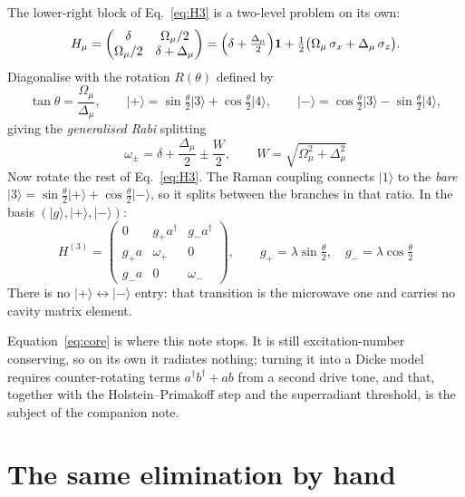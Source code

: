 \documentclass[11pt,a4paper]{article}
\newcommand{\ket}[1]{\lvert #1 \rangle}
\newcommand{\dg}{^{\dagger}}
\newcommand{\Omu}{\Omega_{\mu}}
\newcommand{\Dmu}{\Delta_{\mu}}
\begin{document}
The lower-right block of Eq.~\eqref{eq:H3} is a two-level problem on its own:
\begin{equation}
  H_\mu=\begin{pmatrix}\delta & \Omu/2\\ \Omu/2 & \delta+\Dmu\end{pmatrix}
      = \Bigl(\delta+\tfrac{\Dmu}{2}\Bigr)\mathbf{1}
        + \tfrac12\bigl(\Omu\,\sigma_x + \Dmu\,\sigma_z\bigr).
\end{equation}
Diagonalise with the rotation $R(\theta)$ defined by
\begin{equation}
  \tan\theta = \frac{\Omu}{\Dmu},
  \qquad
  \ket{+} = \sin\tfrac\theta2\ket{3}+\cos\tfrac\theta2\ket{4},
  \qquad
  \ket{-} = \cos\tfrac\theta2\ket{3}-\sin\tfrac\theta2\ket{4},
\end{equation}
giving the \emph{generalised Rabi} splitting
\begin{equation}
  \boxed{\ \omega_\pm=\delta+\frac{\Dmu}{2}\pm\frac{W}{2},
  \qquad W=\sqrt{\Omu^{2}+\Dmu^{2}}\ }
  \label{eq:branches}
\end{equation}
Now rotate the rest of Eq.~\eqref{eq:H3}. The Raman coupling connects $\ket{1}$ to the
\emph{bare} $\ket{3}=\sin\tfrac\theta2\ket{+}+\cos\tfrac\theta2\ket{-}$, so it splits between
the branches in that ratio. In the basis $(\ket{g},\ket{+},\ket{-})$:
\begin{equation}
  \boxed{\;
  H^{(3)}=\begin{pmatrix}
    0 & g_+ a\dg & g_- a\dg\\[3pt]
    g_+ a & \omega_+ & 0\\[3pt]
    g_- a & 0 & \omega_-
  \end{pmatrix},
  \qquad
  g_+=\lambda\sin\tfrac\theta2,\quad g_-=\lambda\cos\tfrac\theta2 \;}
  \label{eq:core}
\end{equation}
There is no $\ket{+}\!\leftrightarrow\!\ket{-}$ entry: that transition is the microwave one and
carries no cavity matrix element.

Equation~\eqref{eq:core} is where this note stops. It is still excitation-number conserving,
so on its own it radiates nothing; turning it into a Dicke model requires counter-rotating
terms $a\dg b\dg+ab$ from a second drive tone, and that, together with the
Holstein--Primakoff step and the superradiant threshold, is the subject of the companion note.


\appendix
\section{The same elimination by hand}
\label{app:hand}
\end{document}
